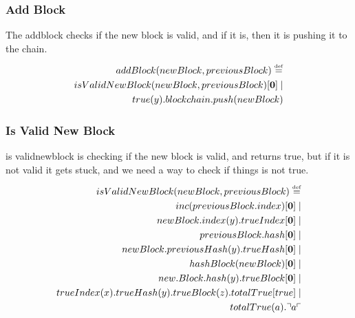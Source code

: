 \subsubsection{Add Block}
The addblock checks if the new block is valid, and if it is, then it is pushing it to the chain.
\begin{align*}
    addBlock(newBlock, previousBlock) \overset{\underset{\mathrm{def}}{}}{=}\\
    isValidNewBlock(newBlock, previousBlock)[\mathbf{0}]\mid \\
    true(y).blockchain.push(newBlock)
\end{align*}

\subsubsection{Is Valid New Block}
is validnewblock is checking if the new block is valid, and returns true, but if it is not valid it gets stuck, and we need a way to check if things is not true.
\begin{align*}
    isValidNewBlock(newBlock, previousBlock) \overset{\underset{\mathrm{def}}{}}{=}\\
    inc(previousBlock.index)[\mathbf{0}] \mid \\
    newBlock.index(y).trueIndex[\mathbf{0}] \mid \\
    previousBlock.hash[\mathbf{0}] \mid \\
    newBlock.previousHash(y).trueHash[\mathbf{0}] \mid \\
    hashBlock(newBlock)[\mathbf{0}] \mid \\
    new.Block.hash(y).trueBlock[\mathbf{0}] \mid \\
    trueIndex(x).trueHash(y).trueBlock(z).totalTrue[true] \mid \\
    totalTrue(a).\urcorner a \ulcorner
\end{align*}




